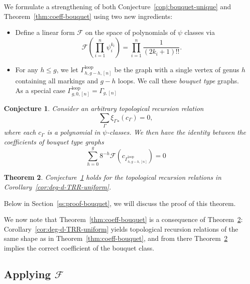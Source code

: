 \documentclass[12pt,reqno]{amsart}
\newcommand{\Gammaloop}{\Gamma^\mathrm{loop}}
\theoremstyle{plain}
\newtheorem{theorem}{Theorem}
\newtheorem{conjecture}[theorem]{Conjecture}
\theoremstyle{definition}
\theoremstyle{remark}
\begin{document}
We formulate a strengthening of both Conjecture~\ref{conj:bouquet-unique} and Theorem~\ref{thm:coeff-bouquet} using two new ingredients:
\begin{itemize}
\item Define a linear form $\mathcal F$ on the space of polynomials of $\psi$ classes via
  \begin{equation*}
    \mathcal F(\prod_{i=1}^{n}\psi_i^{k_i}) = \prod_{i=1}^{n}\frac 1{(2k_i + 1)!!}.
  \end{equation*}
\item For any $h \le g$, we let $\Gammaloop_{h, g-h, [n]}$ be the graph with a single vertex of genus $h$ containing all markings and $g-h$ loops.
  We call these \emph{bouquet type} graphs.
  As a special case $\Gammaloop_{g, 0, [n]} = \Gamma_{g, [n]}$
\end{itemize}
\begin{conjecture}
  \label{conj:bouquet-unique-general}
  Consider an arbitrary topological recursion relation
  \begin{equation*}
    \sum_{\Gamma} {\xi_{\Gamma}}_{*}(c_\Gamma) = 0,
  \end{equation*}
  where each $c_\Gamma$ is a polynomial in $\psi$-classes.
  We then have the identity between the coefficients of bouquet type graphs
  \begin{equation}
    \label{eq:bouquet-identity}
    \sum_{h = 0}^g 8^{-h} \mathcal F(c_{\Gammaloop_{h, g-h, [n]}}) = 0
  \end{equation}
\end{conjecture}
\begin{theorem}
  \label{thm:coeff-bouquet-general}
  Conjecture~\ref{conj:bouquet-unique-general} holds for the topological recursion relations in Corollary~\ref{cor:deg-d-TRR-uniform}.
\end{theorem}
Below in Section~\ref{ss:proof-bouquet}, we will discuss the proof of this theorem.

We now note that Theorem~\ref{thm:coeff-bouquet} is a consequence of Theorem~\ref{thm:coeff-bouquet-general}:
Corollary~\ref{cor:deg-d-TRR-uniform} yields topological recursion relations of the same shape as in Theorem~\ref{thm:coeff-bouquet}, and from there Theorem~\ref{thm:coeff-bouquet-general} implies the correct coefficient of the bouquet class.

\subsection{Applying $\mathcal F$}
\end{document}
